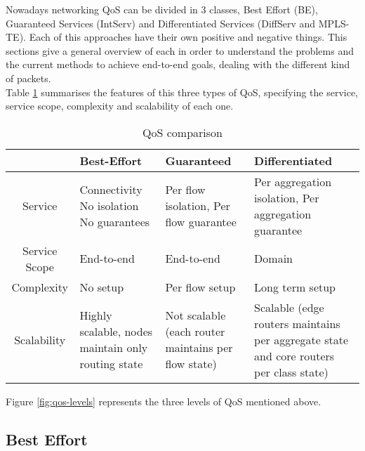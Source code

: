 Nowadays networking QoS can be divided in 3 classes, Best Effort (BE), Guaranteed Services (IntServ) and Differentiated Services (DiffServ and MPLS-TE). Each of this approaches have their own positive and negative things. This sections give a general overview of each in order to understand the problems and the current methods to achieve end-to-end goals, dealing with the different kind of packets.\\

Table \ref{table:qosComp} summarises the features of this three types of QoS, specifying the service, service scope, complexity and scalability of each one.

\begin{table}[ht] 
\caption{QoS comparison} %
\centering %
\begin{tabular}{c || p{2.5cm} p{3.5cm} p{4.5cm}} %
\hline\hline %
  & Best-Effort & Guaranteed & Differentiated \\ [0.5ex] %
\hline %
Service & Connectivity No isolation  No guarantees & Per flow isolation, Per flow guarantee & Per aggregation isolation, Per aggregation guarantee \\   \hline %
Service Scope & End-to-end & End-to-end & Domain \\   \hline
Complexity & No setup & Per flow setup & Long term setup \\   \hline
Scalability & Highly scalable, nodes maintain only routing state & Not scalable (each router maintains per flow state) & Scalable (edge routers maintains per aggregate state and core routers per class state) \\ [1ex] %
\hline %
\end{tabular} 
\label{table:qosComp} %
\end{table}

Figure \ref{fig:qos-levels} represents the three levels of QoS mentioned above.


\subsection{Best Effort\\}
\label{sec:be}

